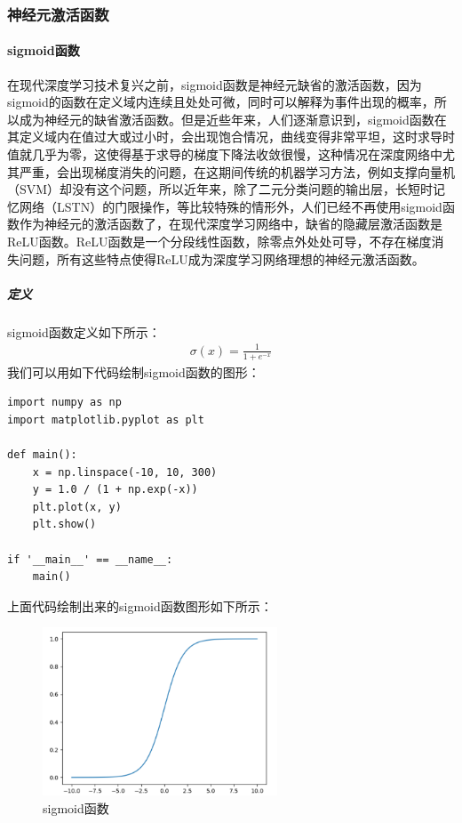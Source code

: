 \documentclass[UTF8]{article}
\begin{document}
\subsubsection{神经元激活函数}
\paragraph{sigmoid函数}
在现代深度学习技术复兴之前，sigmoid函数是神经元缺省的激活函数，因为sigmoid的函数在定义域内连续且处处可微，同时可以解释为事件出现的概率，所以成为神经元的缺省激活函数。但是近些年来，人们逐渐意识到，sigmoid函数在其定义域内在值过大或过小时，会出现饱合情况，曲线变得非常平坦，这时求导时值就几乎为零，这使得基于求导的梯度下降法收敛很慢，这种情况在深度网络中尤其严重，会出现梯度消失的问题，在这期间传统的机器学习方法，例如支撑向量机（SVM）却没有这个问题，所以近年来，除了二元分类问题的输出层，长短时记忆网络（LSTN）的门限操作，等比较特殊的情形外，人们已经不再使用sigmoid函数作为神经元的激活函数了，在现代深度学习网络中，缺省的隐藏层激活函数是ReLU函数。ReLU函数是一个分段线性函数，除零点外处处可导，不存在梯度消失问题，所有这些特点使得ReLU成为深度学习网络理想的神经元激活函数。
\subparagraph{定义}
sigmoid函数定义如下所示：
\begin{equation}
\begin{aligned}
\sigma(x)=\frac{1}{1 + e^{-x}}
\end{aligned}
\label{mlp-sigmoid-def}
\end{equation}
我们可以用如下代码绘制sigmoid函数的图形：
\begin{lstlisting}
import numpy as np
import matplotlib.pyplot as plt

def main():
    x = np.linspace(-10, 10, 300)
    y = 1.0 / (1 + np.exp(-x))
    plt.plot(x, y)
    plt.show()

if '__main__' == __name__:
    main()
\end{lstlisting}
上面代码绘制出来的sigmoid函数图形如下所示：
\begin{figure}[H]
	\caption{sigmoid函数}
	\label{f000035}
	\centering
	\includegraphics[height=5cm]{images/f000035}
\end{figure}
\end{document}
